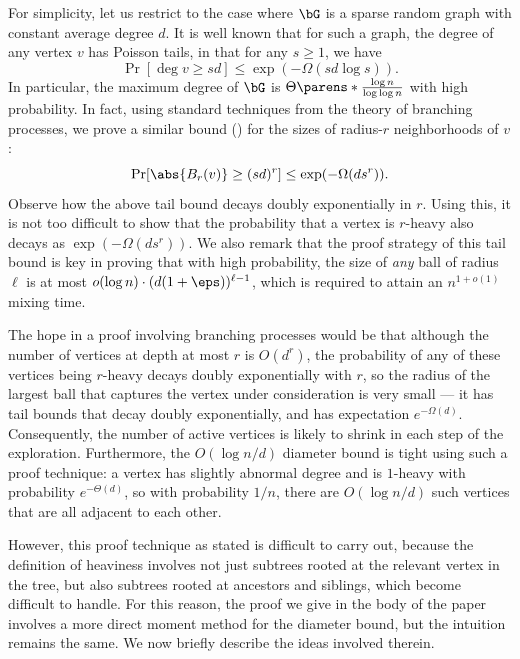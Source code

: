 \documentclass[11pt,letterpaper]{article}
\begin{document}
For simplicity, let us restrict to the case where $\bG$ is a sparse random graph with constant average degree $d$. 
It is well known that for such a graph, the degree of any vertex $v$ has Poisson tails, in that for any $s \ge 1$, we have
\[
    \Pr[\deg{v} \ge sd] \le \exp(-\Omega(sd\log s)).
\]
In particular, the maximum degree of $\bG$ is $\Theta\parens*{\frac{\log n}{\log \log n}}$ with high probability.
In fact, using standard techniques from the theory of branching processes, we prove a similar bound () for the sizes of radius-$r$ neighborhoods of $v$:
\[
    \Pr[\abs{B_{r}(v)} \ge (sd)^{r}] \le \exp(-\Omega(ds^{r})).
\]
Observe how the above tail bound decays doubly exponentially in $r$. Using this, it is not too difficult to show that the probability that a vertex is $r$-heavy also decays as $\exp\left( -\Omega(ds^r) \right)$. We also remark that the proof strategy of this tail bound is key in proving that with high probability, the size of \textit{any} ball of radius $\ell$ is at most $o(\log n) \cdot (d(1+\eps))^{\ell-1}$, which is required to attain an $n^{1+o(1)}$ mixing time.

The hope in a proof involving branching processes would be that although the number of vertices at depth at most $r$ is $O(d^r)$, the probability of any of these vertices being $r$-heavy decays doubly exponentially with $r$, so the radius of the largest ball that captures the vertex under consideration is very small --- it has tail bounds that decay doubly exponentially, and has expectation $e^{-\Omega(d)}$. Consequently, the number of active vertices is likely to shrink in each step of the exploration. Furthermore, the $O(\log n/d)$ diameter bound is tight using such a proof technique: a vertex has slightly abnormal degree and is $1$-heavy with probability $e^{-\Theta(d)}$, so with probability $1/n$, there are $O(\log n/d)$ such vertices that are all adjacent to each other.

However, this proof technique as stated is difficult to carry out, because the definition of heaviness involves not just subtrees rooted at the relevant vertex in the tree, but also subtrees rooted at ancestors and siblings, which become difficult to handle.
For this reason, the proof we give in the body of the paper involves a more direct moment method for the diameter bound, but the intuition remains the same. We now briefly describe the ideas involved therein.
\end{document}
